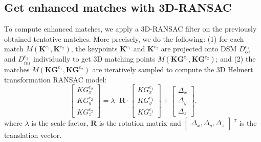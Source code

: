 \subsection{Get enhanced matches with 3D-RANSAC}
To compute enhanced matches, we apply a 3D-RANSAC filter on the previously obtained tentative matches. {More precisely, we do the following}: (1) for each match $M({\mathbf{K}^{e_1},\mathbf{K}^{e_2}})$, the keypoints $\mathbf{K}^{e_1}$ and $\mathbf{K}^{e_2}$ are projected onto \ac{DSM} $D_{co}^{e_1}$ and $D_{ini}^{e_2}$ individually to get 3D matching points $M({\mathbf{KG}^{e_1},\mathbf{KG}^{e_2}})$; and (2) {the matches} $M({\mathbf{KG}^{e_1},\mathbf{KG}^{e_2}})$ are iteratively sampled to compute the 3D Helmert transformation RANSAC model:
\begin{equation}
\left [ \begin{array}{c}
{KG}_x^{e_2}\\
{KG}_y^{e_2}\\
{KG}_z^{e_2}
\end{array}
\right ] =\lambda \cdot \mathbf{R} \cdot {\left [ \begin{array}{c}
	{KG}_x^{e_1}\\
	{KG}_y^{e_1}\\
	{KG}_z^{e_1}
	\end{array}
	\right ]} + \left [ \begin{array}{c}
\Delta_x\\
\Delta_y\\
\Delta_z
\end{array}
\right ]. \label{eq:3DSimP}
\end{equation}
where $\lambda$ is the scale factor, $\mathbf{R}$ is the rotation matrix and $\left [ \begin{array}{c}
\Delta_x, \Delta_y, \Delta_z
\end{array}
\right ]$ $^{^T}$ is the translation vector.

